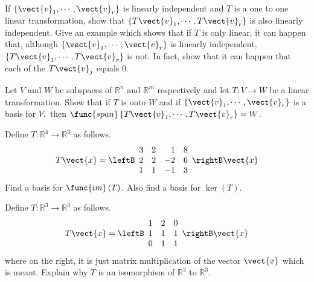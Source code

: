 \begin{enumialphparenastyle}
\begin{ex}
\begin{sol}
\end{sol}
\end{ex}


\begin{ex} If $\left\{ \vect{v}_{1},\cdots ,\vect{v}_{r}\right\} $ is linearly
independent and $T$ is a one to one linear transformation, show that $
\left\{ T\vect{v}_{1},\cdots ,T\vect{v}_{r}\right\} $ is also linearly
independent. Give an example which shows that if $T$ is only linear, it can
happen that, although $\left\{ \vect{v}_{1},\cdots ,\vect{v}_{r}\right\} $ is
linearly independent, $\left\{ T\vect{v}_{1},\cdots ,T\vect{v}_{r}\right\} $
is not. In fact, show that it can happen that each of the $T\vect{v}_{j}$
equals 0.
\end{ex}


\begin{ex} Let $V$ and $W$ be subspaces of $\mathbb{R}^{n}$ and $\mathbb{R}^{m}$
respectively and let $T:V\rightarrow W$ be a linear transformation. Show
that if $T$ is onto $W$ and if $\left\{ \vect{v}_{1},\cdots ,\vect{v}
_{r}\right\} $ is a basis for $V,$ then $\func{span}\left\{ T\vect{v}
_{1},\cdots ,T\vect{v}_{r}\right\} =W$.
\end{ex}


\begin{ex} Define $T:\mathbb{R}^{4}\rightarrow \mathbb{R}^{3}$ as follows. 
\begin{equation*}
T\vect{x}=\leftB 
\begin{array}{rrrr}
3 & 2 & 1 & 8 \\ 
2 & 2 & -2 & 6 \\ 
1 & 1 & -1 & 3
\end{array}
\rightB \vect{x}
\end{equation*}
Find a basis for $\func{im}\left( T\right) $. Also find a basis for $\ker
\left( T\right) .$
\end{ex}


\begin{ex} Define $T:\mathbb{R}^{3}\rightarrow \mathbb{R}^{3}$ as follows. 
\begin{equation*}
T\vect{x}=\leftB 
\begin{array}{ccc}
1 & 2 & 0 \\ 
1 & 1 & 1 \\ 
0 & 1 & 1
\end{array}
\rightB \vect{x}
\end{equation*}
where on the right, it is just matrix multiplication of the vector $\vect{x}$
which is meant. Explain why $T$ is an isomorphism of $\mathbb{R}^{3}$ to $
\mathbb{R}^{3}$.
\end{ex}



\end{enumialphparenastyle}
